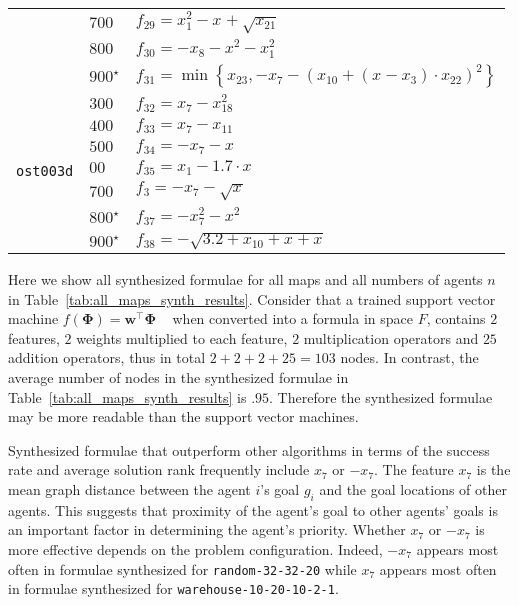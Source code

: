 \documentclass[letterpaper]{article} %
\begin{document}
\begin{table}[t!]
{\begin{tabular}{c|l|l}
            & $ 700 $ & $ f_{29} = x_{1}^2 - x_{} + \sqrt{x_{21}} $ \\
            & $ 800 $ & $ f_{30} = -x_{8} - x_{}^2 - x_{1}^2 $ \\
            & $ 900^\star $ & $ f_{31} = \min\left\{x_{23}, -x_{7} - \left(x_{10} + \left(x_{} - x_{3}\right) \cdot x_{22}\right)^2\right\} $ \\
            \hline
            \multirow{7}{*}{\begin{turn}{90} {\tt ost003d} \end{turn}}
            & $ 300 $ & $ f_{32} = x_{7} - x_{18}^2 $ \\
            & $ 400 $ & $ f_{33} = x_{7} - x_{11} $ \\
            & $ 500 $ & $ f_{34} = -x_{7} - x_{} $ \\
            & $ 00 $ & $ f_{35} = x_{1} - 1.7 \cdot x_{} $ \\
            & $ 700 $ & $ f_{3} = -x_{7} -\sqrt{x_{}} $ \\
            & $ 800^\star $ & $ f_{37} = - x_{7}^2 - x_{}^2 $ \\
            & $ 900^\star $ & $ f_{38} = -\sqrt{3.2 + x_{10} + x_{} + x_{}} $ \\ \bottomrule
        \end{tabular}}
\end{table}

Here we show all synthesized formulae for all maps and all numbers of agents $ n $ in Table~\ref{tab:all_maps_synth_results}. Consider that a trained support vector machine $ f(\mathbf{\Phi}) = \mathbf{w}^\intercal \mathbf{\Phi} $ ~\citep{zhang2022learning} when converted into a formula in space $ F $, contains $ 2 $ features, $ 2 $ weights multiplied to each feature, $ 2 $ multiplication operators and $ 25 $ addition operators, thus in total $ 2 + 2 + 2 + 25 = 103 $ nodes. In contrast, the average number of nodes in the synthesized formulae in Table~\ref{tab:all_maps_synth_results} is $ .95 $. Therefore the synthesized formulae may be more readable than the support vector machines.

Synthesized formulae that outperform other algorithms in terms of the success rate and average solution rank frequently include $ x_7 $ or $ -x_{7} $. The feature $ x_7 $ is the mean graph distance between the agent $ i $'s goal $ g_i $ and the goal locations of other agents. This suggests that proximity of the agent's goal to other agents' goals is an important factor in determining the agent's priority. Whether $ x_7 $ or $ -x_7 $ is more effective depends on the problem configuration. Indeed, $ -x_7 $ appears most often in formulae synthesized for {\tt random-32-32-20} while $ x_7 $ appears most often in formulae synthesized for {\tt warehouse-10-20-10-2-1}.
\end{document}
